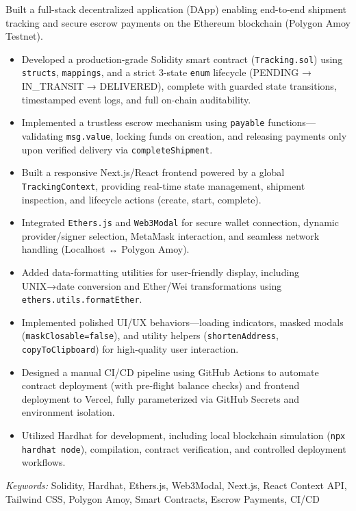 \nointent {}
 
\nointent Built a full-stack decentralized application (DApp) enabling end-to-end shipment tracking and secure escrow payments on the Ethereum blockchain (Polygon Amoy Testnet). 
 
\begin{itemize} 
    \item Developed a production-grade Solidity smart contract (\texttt{Tracking.sol}) using \texttt{structs}, \texttt{mappings}, and a strict 3-state \texttt{enum} lifecycle (PENDING → IN\_TRANSIT → DELIVERED), complete with guarded state transitions, timestamped event logs, and full on-chain auditability. 
    \item Implemented a trustless escrow mechanism using \texttt{payable} functions—validating \texttt{msg.value}, locking funds on creation, and releasing payments only upon verified delivery via \texttt{completeShipment}. 
    \item Built a responsive Next.js/React frontend powered by a global \texttt{TrackingContext}, providing real-time state management, shipment inspection, and lifecycle actions (create, start, complete). 
    \item Integrated \texttt{Ethers.js} and \texttt{Web3Modal} for secure wallet connection, dynamic provider/signer selection, MetaMask interaction, and seamless network handling (Localhost ↔ Polygon Amoy). 
    \item Added data-formatting utilities for user-friendly display, including UNIX→date conversion and Ether/Wei transformations using \texttt{ethers.utils.formatEther}. 
    \item Implemented polished UI/UX behaviors—loading indicators, masked modals (\texttt{maskClosable=false}), and utility helpers (\texttt{shortenAddress}, \texttt{copyToClipboard}) for high-quality user interaction. 
    \item Designed a manual CI/CD pipeline using GitHub Actions to automate contract deployment (with pre-flight balance checks) and frontend deployment to Vercel, fully parameterized via GitHub Secrets and environment isolation. 
    \item Utilized Hardhat for development, including local blockchain simulation (\texttt{npx hardhat node}), compilation, contract verification, and controlled deployment workflows. 
\end{itemize} 
 
\nointent \textit{Keywords:} Solidity, Hardhat, Ethers.js, Web3Modal, Next.js, React Context API, Tailwind CSS, Polygon Amoy, Smart Contracts, Escrow Payments, CI/CD 
